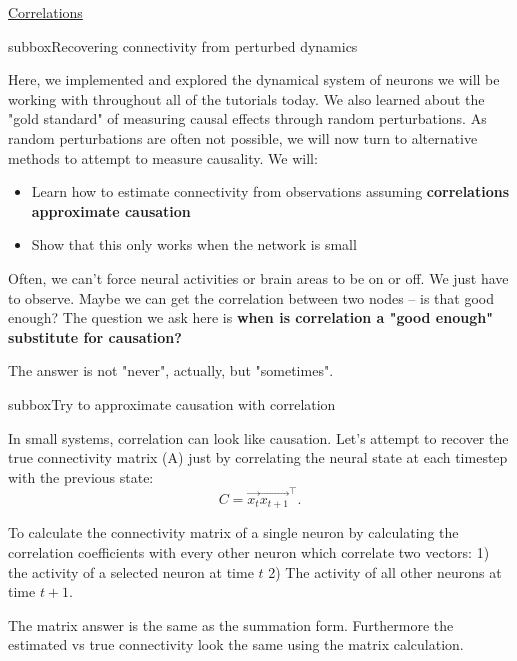 \begin{textbox}{\href{https://compneuro.neuromatch.io/tutorials/W3D5_NetworkCausality/student/W3D5_Tutorial2.html}{Correlations }   }

\begin{subbox}{subbox}{Recovering connectivity from perturbed dynamics}
\scriptsize


Here, we implemented and explored the dynamical system of neurons we will be working with throughout all of the tutorials today. We also learned about the "gold standard" of measuring causal effects through random perturbations. As random perturbations are often not possible, we will now turn to alternative methods to attempt to measure causality. We will:

\begin{itemize}
    \item  Learn how to estimate connectivity from observations assuming \textbf{correlations approximate causation}
\item Show that this only works when the network is small
\end{itemize}


Often, we can't force neural activities or brain areas to be on or off. We just have to observe. Maybe we can get the correlation between two nodes -- is that good enough? The question we ask here is \textbf{when is correlation a "good enough" substitute for causation?}

The answer is not "never", actually, but "sometimes".
\end{subbox}
\begin{subbox}{subbox}{Try to approximate causation with correlation}
\scriptsize



In small systems, correlation can look like causation. Let's attempt to recover the true connectivity matrix (A) just by correlating the neural state at each timestep with the previous state: $$C=\vec{x_t}{\vec{x_{t+1}}^\top}.$$ 

To calculate the connectivity matrix of a single neuron by calculating the correlation coefficients with every other neuron which correlate two vectors: 1) the activity of a selected neuron at time $t$ 2) The activity of all other neurons at time $t+1$.

The matrix answer is the same as the summation form.
Furthermore the estimated vs true connectivity look the same using the matrix calculation.

\begin{center}
    

\end{center}
\end{subbox}
\end{textbox}

